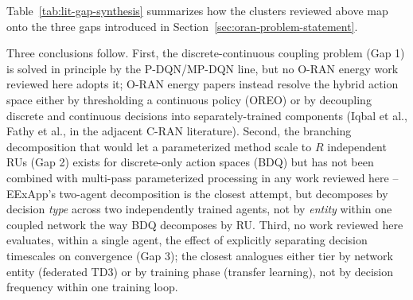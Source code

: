 Table~\ref{tab:lit-gap-synthesis} summarizes how the clusters reviewed above
map onto the three gaps introduced in Section~\ref{sec:oran-problem-statement}.

\begin{table}[htbp]
  \centering
  \caption{Mapping from reviewed literature clusters to the three research
    gaps this thesis addresses. A checkmark indicates the cluster resolves
    that dimension of the gap; a dash indicates it does not.}
  \label{tab:lit-gap-synthesis}
\end{table}

Three conclusions follow. First, the discrete-continuous coupling problem
(Gap 1) is solved in principle by the P-DQN/MP-DQN line, but no O-RAN energy
work reviewed here adopts it; O-RAN energy papers instead resolve the
hybrid action space either by thresholding a continuous policy (OREO) or by
decoupling discrete and continuous decisions into separately-trained
components (Iqbal et al., Fathy et al., in the adjacent C-RAN literature).
Second, the branching decomposition that would let a parameterized method
scale to $R$ independent RUs (Gap 2) exists for discrete-only action spaces
(BDQ) but has not been combined with multi-pass parameterized processing in
any work reviewed here -- EExApp's two-agent decomposition is the closest
attempt, but decomposes by decision \emph{type} across two independently
trained agents, not by \emph{entity} within one coupled network the way BDQ
decomposes by RU. Third, no work reviewed here evaluates, within a single
agent, the effect of explicitly separating decision timescales on
convergence (Gap 3); the closest analogues either tier by network entity
(federated TD3) or by training phase (transfer learning), not by decision
frequency within one training loop.

